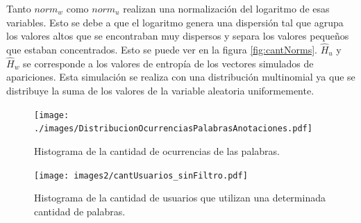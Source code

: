 Tanto $norm_{w}$ como $norm_{u}$ realizan una normalización del logaritmo de esas variables. Esto se debe a que el logaritmo genera una dispersión tal que agrupa los valores altos que se encontraban muy dispersos y separa los valores pequeños que estaban concentrados. 
Esto se puede ver en la figura \ref{fig:cantNorms}.
$\widehat{H}_{u}$ y $\widehat{H}_{w}$ se corresponde a los valores de entropía de los vectores simulados de apariciones. %
Esta simulación se realiza con una distribución multinomial ya que se distribuye la suma de los valores de la variable aleatoria uniformemente. 




\begin{figure}[!ht]\centering
  \begin{minipage}{0.49\textwidth}
    \texttt{[image: ./images/DistribucionOcurrenciasPalabrasAnotaciones.pdf]}
    \caption{Histograma de la cantidad de ocurrencias de las palabras.} 
    \label{fig:cantPalabras} 
   \end{minipage}
   \begin{minipage}{0.49\textwidth}
    \texttt{[image: images2/cantUsuarios\_sinFiltro.pdf]}
    \caption{Histograma de la cantidad de usuarios que utilizan una determinada cantidad de palabras.} 
    \label{fig:cantPalabrasPromedio} 
   \end{minipage}
   
\end{figure}


